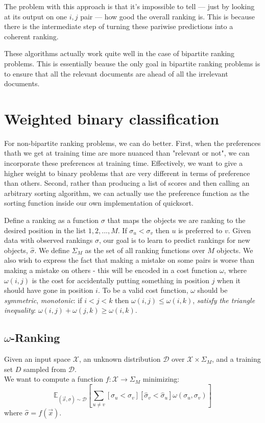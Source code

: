 The problem with this approach is that it's impossible to tell --- just by looking at its output on one \(i,j\) pair --- how good the overall ranking is. This is because there is the intermediate step of turning these pariwise predictions into a coherent ranking.

These algorithms actually work quite well in the case of bipartite ranking problems. This is essentially beause the only goal in bipartite ranking problems is to ensure that all the relevant documents are ahead of all the irrelevant documents. 

\section{Weighted binary classification}
For non-bipartite ranking problems, we can do better. First, when the preferences thath we get at training time are more nuanced than "relevant or not", we can incorporate these preferences at training time. Effectively, we want to give a higher weight to binary problems that are very different in terms of preference than others. Second, rather than producing a list of scores and then calling an arbitrary sorting algorithm, we can actually use the preference function as the sorting function inside our own implementation of quicksort.

Define a ranking as a function \(\sigma\) that maps the objects we are ranking to the desired position in the list \(1,2,...,M\). If \(\sigma_u < \sigma_v\) then \(u\) is preferred to \(v\). Given data with observed rankings \(\sigma\), our goal is to learn to predict rankings for new objects, \(\hat{\sigma}\). We define \(\Sigma_M\) as the set of all ranking functions over \(M\) objects. We also wish to express the fact that making a mistake on some pairs is worse than making a mistake on others - this will be encoded in a cost function \(\omega\), where \(\omega(i,j)\) is the cost for accidentally putting something in position \(j\) when it should have gone in position \(i\). To be a valid cost function, \(\omega\) should be \emph{symmetric}, \emph{monotonic}: if \(i < j < k\) then \(\omega(i,j) \leq \omega(i,k)\), \emph{satisfy the triangle inequality}: \(\omega(i,j) + \omega(j,k) \geq \omega(i,k)\).

\subsection{\(\omega\)-Ranking}
Given an input space \(\mathcal{X}\), an unknown distribution \(\mathcal{D}\) over \(\mathcal{X} \times \Sigma_M\), and a training set \(D\) sampled from \(\mathcal{D}\).\\
We want to compute a function \(f : \mathcal{X} \to \Sigma_M\) minimizing:
\begin{equation}
    \mathbb{E}_{(\vec{x},\sigma) \sim \mathcal{D}} \left[ \sum_{u \neq v} [\sigma_u < \sigma_v][\hat{\sigma}_v < \hat{\sigma}_u] \omega ( \sigma_u , \sigma_v ) \right]
\end{equation}
where \(\hat{\sigma} = f(\vec{x})\).

